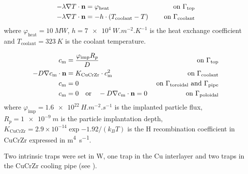 \begin{subequations}
    \begin{align}
    -\lambda \nabla T \cdot \mathbf{n} &=\varphi_\mathrm{heat} \quad  &\text { on } \Gamma_\mathrm{top}\\
    -\lambda \nabla T\cdot \mathbf{n} &= -h \cdot \left(T_\mathrm{coolant} - T\right)\quad &\text { on } \Gamma_\mathrm{coolant}
    \end{align}
    \labeq{bc thermal DEMO monoblock}
\end{subequations}
where $\varphi_\mathrm{heat}=\SI{10}{MW}$, $h=\SI{7e4}{W.m^{-2}.K^{-1}}$ is the heat exchange coefficient and $T_\mathrm{coolant} = \SI{323}{K}$ is the coolant temperature.

\begin{subequations}
    \begin{align}
    c_\mathrm{m} &=  \frac{\varphi_\mathrm{imp} R_p}{D} \quad &\text { on } \Gamma_\mathrm{top}\\
    -D \nabla c_\mathrm{m} \cdot \mathbf{n} &= K_\mathrm{CuCrZr} \cdot c_\mathrm{m}^{2} \quad &\text { on } \Gamma_\mathrm{coolant} \\
    c_\mathrm{m} &=  0 \quad &\text { on } \Gamma_\mathrm{toroidal} \text{  and  } \Gamma_\mathrm{pipe} \\
    c_\mathrm{m} &=  0 \quad \text{or} \quad -D \nabla c_\mathrm{m} \cdot \mathbf{n} = 0 &\text { on } \Gamma_\mathrm{poloidal}
    \end{align}
    \labeq{bc H transport DEMO monoblock}
\end{subequations}
where $\varphi_\mathrm{imp} = \SI{1.6e22}{H.m^{-2}.s^{-1}}$ is the implanted particle flux, $R_p = \SI{1e-9}{m}$ is the particle implantation depth, $K_\mathrm{CuCrZr}=2.9\times 10^{-14}\exp{-1.92/(k_B T)}$ is the H recombination coefficient in CuCrZr expressed in \si{m^4.s^{-1}}.

Two intrinsic traps were set in W, one trap in the Cu interlayer and two traps in the CuCrZr cooling pipe (see ).


